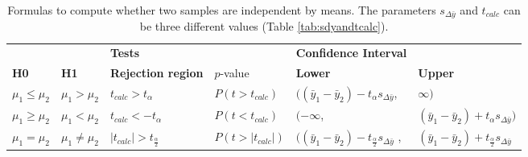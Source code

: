 \documentclass[10pt,a4paper]{article}
\begin{document}
	\begin{table}[h!]
	\centering
	\caption{Formulas to compute whether two samples are independent by means. 
	The parameters $s_{\Delta\bar{y}}$ and $t_{calc}$ can be three different 
	values (Table \ref{tab:sdyandtcalc}). \cite{heiberger2004statistical}}
	\label{tab:IndepTest}
	\begin{tabular}{llllll}
		\hline
		 &  & 
		\multicolumn{2}{l}{\textbf{Tests}} & 
		\textbf{Confidence Interval} & \textbf{}               \\ \cline{3-6} 
		\textbf{H0}              & \textbf{H1}              & \textbf{Rejection 
		region}   & $p$-value                      & 
		\textbf{Lower}               & \textbf{Upper}          \\ \hline
		$\mu_1 \leq \mu_2$                  & $\mu_1 > \mu_2$       & 
		$t_{calc} 
		> t_\alpha$       & $P(t > t_{calc})$      & 
		$((\bar{y}_1 
		- \bar{y}_2) - t_\alpha s_{\Delta \bar{y}}$,       & 
		$\infty)$                     \\
		$\mu_1 \geq \mu_2$                  & $\mu_1 < \mu_2$          & 
		$t_{calc} 
		< -t_\alpha$          & $P(t < t_{calc})$         & 
		$(-\infty$,                        & $(\bar{y}_1 - \bar{y}_2) + 
		t_\alpha 
		s_{\Delta \bar{y}})$ \\
		$\mu_1 = \mu_2$                  & $\mu_1 \neq \mu_2$                  
		& 
		$|t_{calc}| > t_{\frac{\alpha}{2}}$     & $P(t >
		|t_{calc}|)$  & $((\bar{y}_1 - \bar{y}_2) - 
		t_{\frac{\alpha}{2}} 
		s_{\Delta\bar{y}}$ 
		,     & $(\bar{y}_1 - \bar{y}_2) + t_{\frac{\alpha}{2}} 
		s_{\Delta 
		\bar{y}}$  
		\\ 
		\hline
	\end{tabular}
	\end{table}
	
\end{document}
